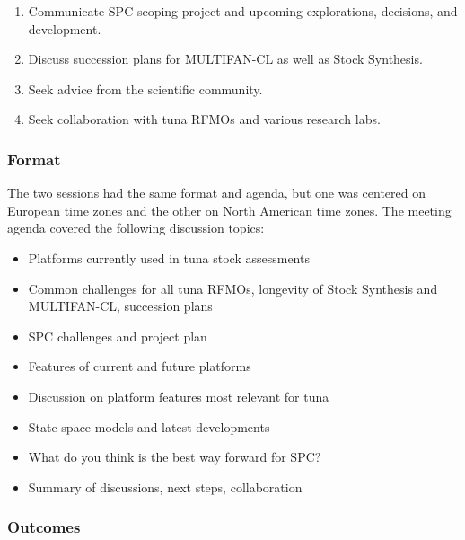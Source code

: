 \documentclass{SCreport}
\begin{document}
\begin{enumerate}
  \item Communicate SPC scoping project and upcoming explorations, decisions,
  and development.
  \item Discuss succession plans for MULTIFAN-CL as well as Stock Synthesis.
  \item Seek advice from the scientific community.
  \item Seek collaboration with tuna RFMOs and various research labs.
\end{enumerate}

\newpage

\subsubsection{Format}

The two sessions had the same format and agenda, but one was centered on
European time zones and the other on North American time zones. The meeting
agenda covered the following discussion topics:

\begin{itemize}
  \item Platforms currently used in tuna stock assessments\\[-4ex]
  \item Common challenges for all tuna RFMOs, longevity of Stock Synthesis and
  MULTIFAN-CL, succession plans\\[-4ex]
  \item SPC challenges and project plan\\[-4ex]
  \item Features of current and future platforms\\[-4ex]
  \item Discussion on platform features most relevant for tuna\\[-4ex]
  \item State-space models and latest developments\\[-4ex]
  \item What do you think is the best way forward for SPC?\\[-4ex]
  \item Summary of discussions, next steps, collaboration
\end{itemize}

\subsubsection{Outcomes}
\end{document}
